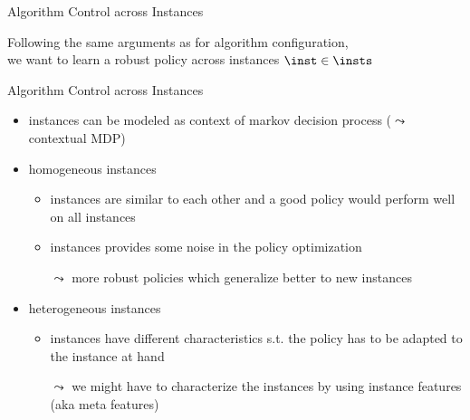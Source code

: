 \begin{frame}[c]{Algorithm Control across Instances }



\bigskip

Following the same arguments as for algorithm configuration,\\
we want to learn a \alert{robust policy across instances $\inst \in \insts$}

\end{frame}
\begin{frame}[c]{Algorithm Control across Instances }

\begin{itemize}
	\item instances can be modeled as context of markov decision process ($\leadsto$ contextual MDP)
	\medskip
	\pause
	\item \alert{homogeneous} instances
	\begin{itemize}
		\item instances are similar to each other and a good policy would perform well on all instances
		\item instances provides some noise in the policy optimization  
		\item[$\leadsto$] more robust policies which generalize better to new instances
	\end{itemize}
	\medskip
	\pause
	\item \alert{heterogeneous} instances
	\begin{itemize}
		\item instances have different characteristics s.t. the policy has to be adapted to the instance at hand
		\item[$\leadsto$] we might have to characterize the instances by using instance features (aka meta features)
	\end{itemize}
\end{itemize}

\end{frame}
